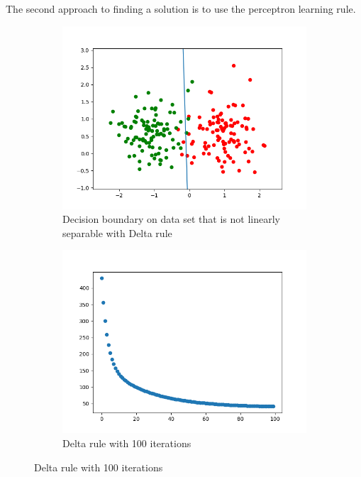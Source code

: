 \documentclass[a4paper]{article}
\begin{document}
The second approach to finding a solution is to use the perceptron learning rule.  
\begin{figure}[htb]
    \centering
    \begin{subfigure}{0.4\textwidth}
        \includegraphics[width=\textwidth]{Labs/Lab 1/Lab 1a/Results/decicion-boundary-not-separable.png}
        \caption{Decision boundary on data set that is not linearly separable with Delta rule}
        \label{fig:Decision-boundary-not-linearly-separable}
    \end{subfigure}
    \hfill
    \begin{subfigure}{0.4\textwidth}
        \includegraphics[width=\textwidth]{Labs/Lab 1/Lab 1a/Results/error-convergance.png}
        \caption{Delta rule with 100 iterations}
        \label{fig:Error-convergance}
    \end{subfigure}
\end{figure}
\end{document}
